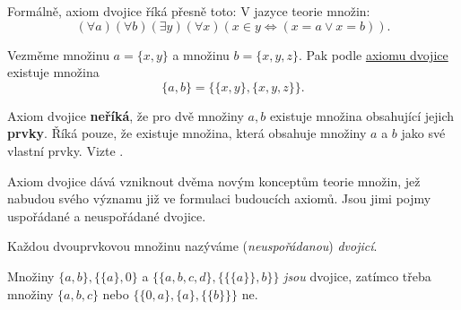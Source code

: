 Formálně, axiom dvojice říká přesně toto:  V jazyce teorie množin:
\begin{equation}
  \label{eq:axiom-dvojice}
  ( \forall a) ( \forall b)( \exists y)( \forall x)(x \in y \Leftrightarrow (x =
  a \vee x = b)).
\end{equation}
\begin{example}
  \label{exam:axiom-dvojice}
  Vezměme množinu $a = \{x, y\}$ a množinu $b = \{x, y, z\}$. Pak podle
  \hyperref[eq:axiom-dvojice]{axiomu dvojice} existuje množina
  \[
    \{a, b\} = \{\{x, y\}, \{x, y, z\}\}.
  \]
\end{example}
\lessboxspace
\begin{warning}
  Axiom dvojice \textbf{neříká}, že pro dvě množiny $a, b$ existuje množina
  obsahující jejich \textbf{prvky}. Říká pouze, že existuje množina, která
  obsahuje množiny $a$ a $b$ jako své vlastní prvky. Vizte
  .
\end{warning}
Axiom dvojice dává vzniknout dvěma novým konceptům teorie množin, jež nabudou
svého významu již ve formulaci budoucích axiomů. Jsou jimi pojmy uspořádané a
neuspořádané dvojice.

\begin{definition}[Dvojice]
  \label{def:dvojice}
  Každou dvouprvkovou množinu nazýváme (\emph{neuspořádanou}) \emph{dvojicí}.
\end{definition}
\begin{example}
  \label{exam:dvojice}
  Množiny $\{a, b\}, \{\{a\}, 0\}$ a $\{\{a, b, c, d\}, \{\{\{a\}\}, b\}\}$
  \emph{jsou} dvojice, zatímco třeba množiny $\{a, b, c\}$ nebo $\{\{0, a\},
  \{a\}, \{\{b\}\}\}$ ne.
\end{example}

